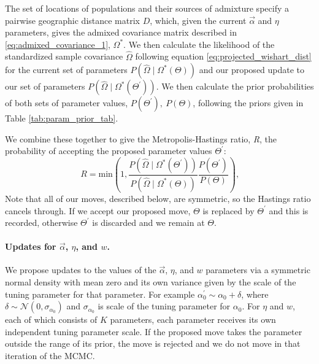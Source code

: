 \documentclass[12pt]{article}
\newcommand{\identifyadmixsource}[1]{{#1^{*}}}
\begin{document}
The set of locations of populations and their sources of admixture specify a pairwise geographic distance matrix $D$, 
which, given the current $\vec{\alpha}$ and $\eta$ parameters, 
gives the admixed covariance matrix described in \eqref{eq:admixed_covariance_1}, $\identifyadmixsource{\Omega}$.  
We then calculate the likelihood of the standardized sample covariance $\widehat{\Omega}$ 
following equation \eqref{eq:projected_wishart_dist} for the current set of parameters 
$P(\widehat{\Omega} \mid \identifyadmixsource{\Omega}(\Theta))$ and our proposed update to our set of parameters 
$P(\widehat{\Omega} \mid \identifyadmixsource{\Omega}(\Theta^{\prime}))$. 
We then calculate the prior probabilities of both sets of parameter values, $P(\Theta^{\prime}),~P(\Theta) $, 
following the priors given in Table \ref{tab:param_prior_tab}.

We combine these together to give the Metropolis-Hastings ratio, \emph{R}, the probability of accepting the proposed parameter values $\Theta^{\prime}$:
\begin{equation}
R = \text{min}\left(1, \frac{P(\widehat{\Omega} \mid \identifyadmixsource{\Omega}(\Theta^{\prime}))} {P(\widehat{\Omega} \mid \identifyadmixsource{\Omega}(\Theta))} 
				\frac{P(\Theta^{\prime})}{P(\Theta)} 	\right) \text{,}
\label{eq:MH_algorithm}
\end{equation}
Note that all of our moves, described below, are symmetric, so the Hastings ratio cancels through. If we accept our proposed move, $\Theta$ is replaced by $\Theta^{\prime}$ and this is recorded, otherwise $\Theta^{\prime}$ is discarded and we remain at $\Theta$. 

\paragraph{Updates for $\vec{\alpha}$, $\eta$, and $w$.}
We propose updates to the values of the $\vec{\alpha}$, $\eta$, and $w$ parameters via a symmetric normal density with mean zero and its own variance given by the scale of the tuning parameter for that parameter.  For example $\alpha_0^{\prime} \sim \alpha_0 + \delta$, where $\delta \sim \mathcal{N}(0,\sigma_{\alpha_0})$ and $\sigma_{\alpha_0}$ is scale of the tuning parameter for $\alpha_0$.  For $\eta$ and $w$, each of which consists of $K$ parameters, each parameter receives its own independent tuning parameter scale. If the proposed move takes the parameter outside the range of its prior, the move is rejected and we do not move in that iteration of the MCMC.
\end{document}
